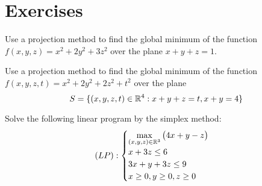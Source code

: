 
\section*{Exercises}

\begin{problem}[Basic]
Use a projection method to find the global minimum of the function $f(x,y,z)=x^2+2y^2+3z^2$ over the plane $x+y+z=1$.
\end{problem}

\begin{problem}[Basic]
Use a projection method to find the global minimum of the function $f(x,y,z,t)=x^2+2y^2+2z^2+t^2$ over the plane 
\begin{equation*}
S = \{ (x,y,z,t) \in \mathbb{R}^4 : x+y+z=t, x+y=4 \}
\end{equation*}
\end{problem}

\begin{problem}[Basic]
Solve the following linear program by the simplex method:
\begin{equation*}
(LP): \begin{cases}
\displaystyle{\max_{(x,y,z) \in \mathbb{R}^3} \big( 4x+y-z \big)} \\
x+3z \leq 6 \\
3x+y+3z \leq 9 \\
x \geq 0, y\geq 0, z\geq 0
\end{cases}
\end{equation*}
\end{problem}

